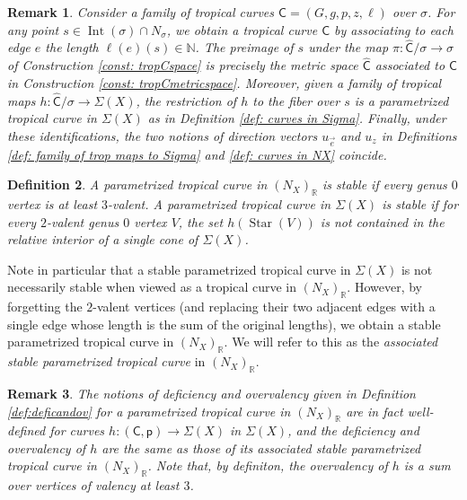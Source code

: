 \documentclass{article}
\newtheorem{definition}{Definition}[section]
\newtheorem{remark}[definition]{Remark}
\newcommand{\tropC}{\mathsf{C}}
\begin{document}
    \begin{remark}
        Consider a family of tropical curves $\tropC = (G, g, p, z, \ell)$ over $\sigma$. For any point $s \in \operatorname{Int}(\sigma) \cap N_{\sigma}$, we obtain a tropical curve $\mathsf{C}$ by associating to each edge $e$ the length $\ell(e)(s) \in \mathbb{N}$. The preimage of $s$ under the map $\pi: \hat{\tropC}/\sigma \rightarrow \sigma$ of Construction \ref{const: tropCspace} is precisely the metric space $\hat{\mathsf{C}}$ associated to $\mathsf{C}$ in Construction \ref{const: tropCmetricspace}. Moreover, given a family of tropical maps $h: \hat{\tropC}/\sigma \to \Sigma(X)$, the restriction of $h$ to the fiber over $s$ is a parametrized tropical curve in $\Sigma(X)$ as in Definition \ref{def: curves in Sigma}. Finally, under these identifications, the two notions of direction vectors $u_{\vec{e}}$ and $u_z$ in Definitions \ref{def: family of trop maps to Sigma} and \ref{def: curves in NX} coincide.
    \end{remark}

   
    
    \begin{definition}
        A parametrized tropical curve in $(N_X)_{\mathbb{R}}$ is stable if every genus $0$ vertex is at least $3$-valent. A parametrized tropical curve in $\Sigma(X)$ is stable if for every $2$-valent genus $0$ vertex $V$, the set $h(\operatorname{Star}(V))$ is not contained in the relative interior of a single cone of $\Sigma(X)$.
    \end{definition}

    Note in particular that a stable parametrized tropical curve in $\Sigma(X)$ is not necessarily stable when viewed as a tropical curve in $(N_X)_{\mathbb{R}}$. However, by forgetting the $2$-valent vertices (and replacing their two adjacent edges with a single edge whose length is the sum of the original lengths), we obtain a stable parametrized tropical curve in $(N_X)_{\mathbb{R}}$. We will refer to this as the \emph{associated stable parametrized tropical curve} in $(N_X)_{\mathbb{R}}$.

     \begin{remark} 
        The notions of deficiency and overvalency given in Definition \ref{def:deficandov} for a parametrized tropical curve in $(N_X)_{\mathbb{R}}$ are in fact well-defined for curves  $h \colon (\mathsf{C},\mathsf{p}) \to\Sigma(X)$ in $\Sigma(X)$, and the deficiency and overvalency of $h$ are the same as those of its associated stable parametrized tropical curve in $(N_X)_{\mathbb{R}}$. Note that, by definiton, the overvalency of $h$ is a sum over vertices of valency at least $3$.
    \end{remark}
\end{document}

